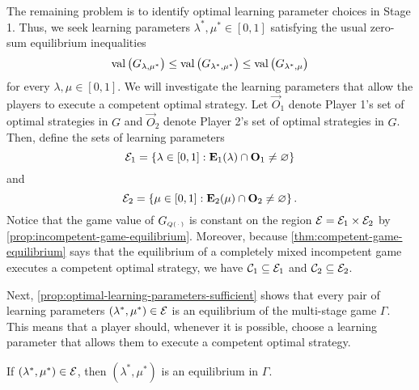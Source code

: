     The remaining problem is to identify optimal learning parameter choices in Stage 1.
    Thus, we seek learning parameters $\lambda^*, \mu^* \in [0, 1]$ satisfying the usual zero-sum equilibrium inequalities
    \begin{equation} \label{eq:multistage-equilibrium-inequalities}
        \operatorname{val}\big(G_{\lambda, \mu^*}\big)
            \le \operatorname{val}\big(G_{\lambda^*, \mu^*}\big)
            \le \operatorname{val}\big(G_{\lambda^*, \mu}\big)
    \end{equation}
    for every $\lambda, \mu \in [0, 1]$.
    We will investigate the learning parameters that allow the players to execute a competent optimal strategy.
    Let $\vec{O}_1$ denote Player 1's set of optimal strategies in $G$ and $\vec{O}_2$ denote Player 2's set of optimal strategies in $G$.
    Then, define the sets of learning parameters
    \begin{equation}
        \mathcal{E}_1
            =
            \left\{
                \lambda \in [0, 1]
                : \mathbf{E}_1(\lambda) \cap \mathbf{O}_1 \neq \varnothing
            \right\}
    \end{equation}
    and
    \begin{equation}
        \mathcal{E}_2
            =
            \left\{
                \mu \in [0, 1]
                : \mathbf{E}_2(\mu) \cap \mathbf{O}_2
                \neq \varnothing
            \right\}.
    \end{equation}
    Notice that the game value of $G_\ms{Q(\funcdot)}$ is constant on the region $\mathcal{E} = \mathcal{E}_1 \times \mathcal{E}_2$ by \autoref{prop:incompetent-game-equilibrium}.
    Moreover, because \autoref{thm:competent-game-equilibrium} says that the equilibrium of a completely mixed incompetent game executes a competent optimal strategy, we have $\mathcal{C}_1 \subseteq \mathcal{E}_1$ and $\mathcal{C}_2 \subseteq \mathcal{E}_2$.

    Next, \autoref{prop:optimal-learning-parameters-sufficient} shows that every pair of learning parameters $(\lambda^*, \mu^*) \in \mathcal{E}$ is an equilibrium of the multi-stage game $\Gamma$.
    This means that a player should, whenever it is possible, choose a learning parameter that allows them to execute a competent optimal strategy.

    \begin{proposition} \label{prop:optimal-learning-parameters-sufficient}
        If $(\lambda^*, \mu^*) \in \mathcal{E}$, then $(\lambda^*, \mu^*)$ is an equilibrium in $\Gamma$.
    \end{proposition}

